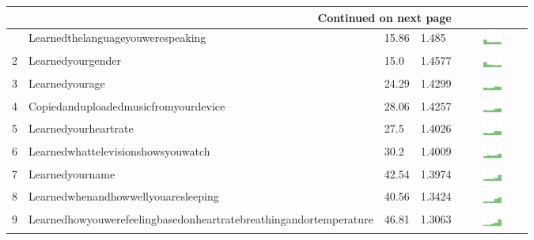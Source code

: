 \documentclass[a4paper,12pt]{article}
\begin{document}
\begin{longtable}{| p{0.5cm} | p{7cm} | p{1cm} |p{1cm} | c |}
\hline \multicolumn{4}{|r|}{{Continued on next page}} \\ \hline
\endfoot
\hline 
\endlastfoot
1 & Learnedthelanguageyouwerespeaking & 15.86 & 1.485&\includegraphics[width = 2cm, height = 0.5cm]{tables/learnedthelanguageyouwerespeakingcombined} \\ 
2 & Learnedyourgender & 15.0 & 1.4577&\includegraphics[width = 2cm, height = 0.5cm]{tables/learnedyourgendercombined} \\ 
3 & Learnedyourage & 24.29 & 1.4299&\includegraphics[width = 2cm, height = 0.5cm]{tables/learnedyouragecombined} \\ 
4 & Copiedanduploadedmusicfromyourdevice & 28.06 & 1.4257&\includegraphics[width = 2cm, height = 0.5cm]{tables/copiedanduploadedmusicfromyourdevicecombined} \\ 
5 & Learnedyourheartrate & 27.5 & 1.4026&\includegraphics[width = 2cm, height = 0.5cm]{tables/learnedyourheartratecombined} \\ 
6 & Learnedwhattelevisionshowsyouwatch & 30.2 & 1.4009&\includegraphics[width = 2cm, height = 0.5cm]{tables/learnedwhattelevisionshowsyouwatchcombined} \\ 
7 & Learnedyourname & 42.54 & 1.3974&\includegraphics[width = 2cm, height = 0.5cm]{tables/learnedyournamecombined} \\ 
8 & Learnedwhenandhowwellyouaresleeping & 40.56 & 1.3424&\includegraphics[width = 2cm, height = 0.5cm]{tables/learnedwhenandhowwellyouaresleepingcombined} \\ 
9 & Learnedhowyouwerefeelingbasedonheartratebreathingandortemperature & 46.81 & 1.3063&\includegraphics[width = 2cm, height = 0.5cm]{tables/learnedhowyouwerefeelingbasedonheartratebreathingandortemperaturecombined} \\ 

\end{longtable}
\end{document}
